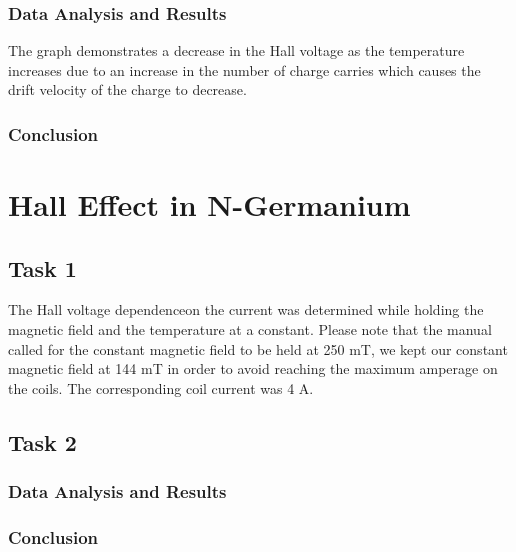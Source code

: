 \documentclass[a4paper]{article}
\begin{document}
\subsubsection{Data Analysis and Results}
\qq The graph demonstrates a decrease in the Hall voltage as the
temperature increases due to an increase in the number of charge
carries which causes the drift velocity of the charge to decrease.

\subsubsection{Conclusion}

\section{Hall Effect in N-Germanium}

\subsection{Task 1}

\qq The Hall voltage dependenceon the current was determined while
holding the magnetic field and the temperature at a constant. Please
note that the manual called for the constant magnetic field to be held
at 250 mT, we kept our constant magnetic field at 144 mT in order to
avoid reaching the maximum amperage on the coils. The corresponding
coil current was 4 A.

\subsection{Task 2}

\subsubsection{Data Analysis and Results}

\subsubsection{Conclusion}
\end{document}
